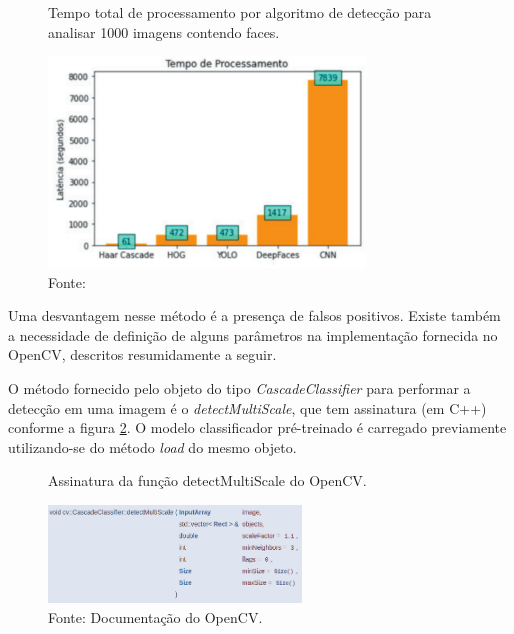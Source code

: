 \begin{figure}[H]
    \centering
    \caption[Tempo total de processamento por algoritmo de detecção para analisar 1000 imagens contendo faces.]{Tempo total de processamento por algoritmo de detecção para analisar 1000 imagens contendo faces.}
    \includegraphics[width=0.75\textwidth]{Cap3_Desenvolvimento/Figures/comparativoAlgoritmosDeteccao.png}
    \caption*{Fonte: \cite{Carvalho2022}}
    \label{fig:comparativoAlgoritmosDeteccao}
\end{figure}

Uma desvantagem nesse método é a presença de falsos positivos. Existe também a necessidade de definição de alguns parâmetros na implementação fornecida no OpenCV, descritos resumidamente a seguir.

O método fornecido pelo objeto do tipo \emph{CascadeClassifier} \cite{OpenCV-CascadeClassifier} para performar a detecção em uma imagem é o \emph{detectMultiScale}, que tem assinatura (em C++) conforme a figura \ref{fig:detectMultiScaleFcn}. O modelo classificador pré-treinado é carregado previamente utilizando-se do método \emph{load} do mesmo objeto.

\begin{figure}[H]
    \centering
    \caption[Assinatura da função detectMultiScale do OpenCV.]{Assinatura da função detectMultiScale do OpenCV.}
    \includegraphics[width=0.60\textwidth]{Cap3_Desenvolvimento/Figures/detectMultiScaleFcn.jpg}
    \caption*{Fonte: Documentação do OpenCV.\footnotemark}
    \label{fig:detectMultiScaleFcn}
\end{figure}

